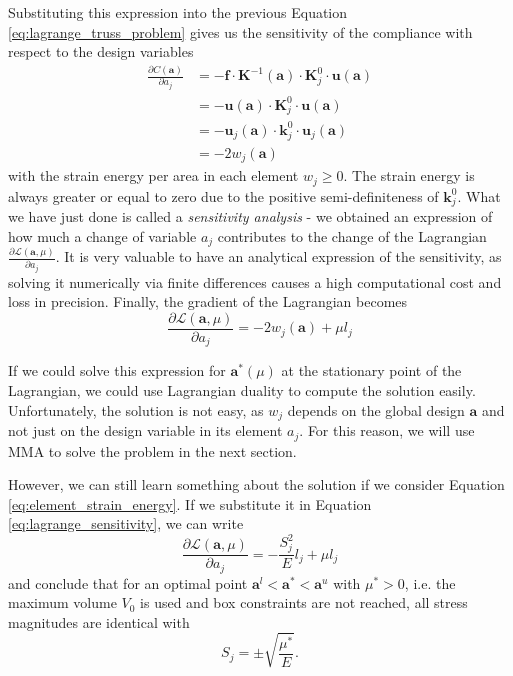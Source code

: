 Substituting this expression into the previous Equation \eqref{eq:lagrange_truss_problem} gives us the sensitivity of the compliance with respect to the design variables 
\begin{align}
    \frac{\partial C (\mathbf{a})}{\partial a_j} 
    &= - \mathbf{f} \cdot \mathbf{K}^{-1}(\mathbf{a}) \cdot \mathbf{K}^0_j \cdot \mathbf{u} (\mathbf{a})  \\
    &= - \mathbf{u} (\mathbf{a}) \cdot \mathbf{K}^0_j \cdot \mathbf{u} (\mathbf{a})  \\
    &= - \mathbf{u}_j (\mathbf{a}) \cdot \mathbf{k}^0_j \cdot \mathbf{u}_j (\mathbf{a})  \\
    &= - 2 w_j (\mathbf{a})
    \label{eq:compliance_sensitivity}
\end{align}
with the strain energy per area in each element $w_j \ge 0$. The strain energy is always greater or equal to zero due to the positive semi-definiteness of $\mathbf{k}^0_j$.
What we have just done is called a \emph{sensitivity analysis} - we obtained an expression of how much a change of variable $a_j$ contributes to the change of the Lagrangian $\frac{\partial \mathcal{L} (\mathbf{a}, \mu)}{\partial a_j}$. It is very valuable to have an analytical expression of the sensitivity, as solving it numerically via finite differences causes a high computational cost and loss in precision.
Finally, the gradient of the Lagrangian becomes 
\begin{equation}
    \frac{\partial \mathcal{L} (\mathbf{a}, \mu)}{\partial a_j} 
    = - 2 w_j (\mathbf{a}) + \mu l_j
    \label{eq:lagrange_sensitivity}
\end{equation}

If we could solve this expression for $\mathbf{a}^*(\mu)$ at the stationary point of the Lagrangian, we could use Lagrangian duality to compute the solution easily. Unfortunately, the solution is not easy, as $w_j$ depends on the global design $\mathbf{a}$ and not just on the design variable in its element $a_j$. For this reason, we will use MMA to solve the problem in the next section.

However, we can still learn something about the solution if we consider Equation \eqref{eq:element_strain_energy}. If we substitute it in Equation \eqref{eq:lagrange_sensitivity}, we can write 
\begin{equation}
    \frac{\partial \mathcal{L} (\mathbf{a}, \mu)}{\partial a_j} = - \frac{S^2_j}{E} l_j + \mu l_j
\end{equation}
and conclude that for an optimal point $\mathbf{a}^l < \mathbf{a}^* < \mathbf{a}^u$ with $\mu^*>0$, i.e. the maximum volume $V_0$ is used and box constraints are not reached, all stress magnitudes are identical with
\begin{equation}
    S_j = \pm \sqrt{\frac{\mu^*}{E}}.
\end{equation}

